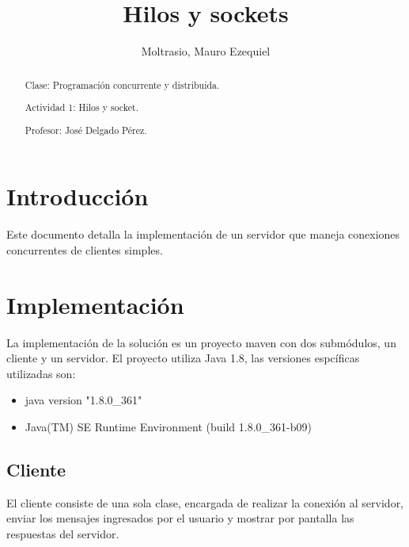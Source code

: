 \documentclass[a4paper]{article}
\begin{document}
\title{Hilos y sockets}
\author{Moltrasio, Mauro Ezequiel}
\date{}
\renewcommand{\abstractname}{\vspace{-\baselineskip}}

\begin{titlingpage}
    \maketitle
    \begin{abstract}

        Clase: Programación concurrente y distribuida.

        Actividad 1: Hilos y socket.

        Profesor: José Delgado Pérez.
    \end{abstract}
\end{titlingpage}

\maketitle
\tableofcontents

\section{Introducción}

Este documento detalla la implementación de un servidor que maneja conexiones
concurrentes de clientes simples.

\section{Implementación}

La implementación de la solución es un proyecto maven con dos submódulos, un
cliente y un servidor. El proyecto utiliza Java 1.8, las versiones espcíficas
utilizadas son:

\begin{itemize}
    \item java version "1.8.0\_361"
    \item Java(TM) SE Runtime Environment (build 1.8.0\_361-b09)
\end{itemize}

\subsection{Cliente}

El cliente consiste de una sola clase, encargada de realizar la conexión al
servidor, enviar los mensajes ingresados por el usuario y mostrar por pantalla
las respuestas del servidor.
\end{document}
